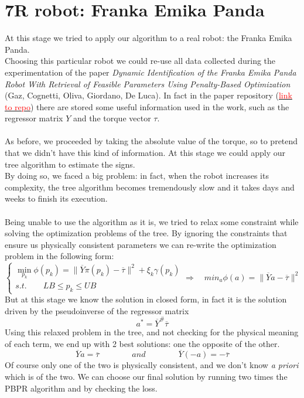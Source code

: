 \documentclass{article}
\begin{document}
\section{7R robot: Franka Emika Panda}
At this stage we tried to apply our algorithm to a real robot: the Franka Emika Panda.\\
Choosing this particular robot we could re-use all data collected during the experimentation of the paper \emph{Dynamic Identification of the Franka Emika Panda Robot With Retrieval of Feasible Parameters Using Penalty-Based Optimization} (Gaz, Cognetti, Oliva, Giordano, De Luca). In fact in the paper repository (\href{https://github.com/marcocognetti/FrankaEmikaPandaDynModel}{\textcolor{red}{link to repo}}) there are stored some useful information used in the work, such as the regressor matrix $Y$ and the torque vector $\tau$.\\\\
As before, we proceeded by taking the absolute value of the torque, so to pretend that we didn't have this kind of information. At this stage we could apply our tree algorithm to estimate the signs.\\
By doing so, we faced a big problem: in fact, when the robot increases its complexity, the tree algorithm becomes tremendously slow and it takes days and weeks to finish its execution.\\\\
Being unable to use the algorithm as it is, we tried to relax some constraint while solving the optimization problems of the tree. By ignoring the constraints that ensure us physically consistent parameters we can re-write the optimization problem in the following form:
\[\begin{cases}\min_{p_k}{\phi(p_k)} = \lVert \overline{Y}\pi(p_k)-\overline{\tau} \rVert^2 + \xi_k \gamma(p_k)\\s.t. \qquad LB\le p_k \le UB\end{cases} \Rightarrow \quad min_{a}{\phi(a)} = \lVert \overline{Y}a-\overline{\tau} \rVert^2\]
But at this stage we know the solution in closed form, in fact it is the solution driven by the pseudoinverse of the regressor matrix
\[a^* = \overline{Y}^{\#}\overline{\tau}\]
Using this relaxed problem in the tree, and not checking for the physical meaning of each term, we end up with 2 best solutions: one the opposite of the other.
\[\overline{Y}a = \overline{\tau} \qquad \qquad and \qquad \qquad \overline{Y}(-a) = -\overline{\tau}\]
Of course only one of the two is physically consistent, and we don't know \emph{a priori} which is of the two. We can choose our final solution by running two times the PBPR algorithm and by checking the loss.\\\\
\end{document}
